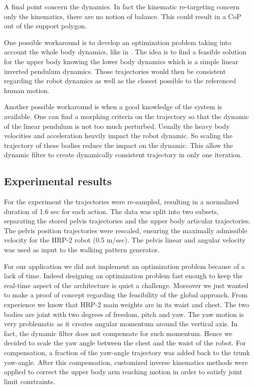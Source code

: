 A final point concern the dynamics.
In fact the kinematic re-targeting concern only the kinematics, there are no notion of balance.
This could result in a CoP out of the support polygon.

One possible workaround is to develop an optimization problem taking into account the whole body dynamics, like in \cite{ramos:ram:2015}.
The idea is to find a feasible solution for the upper body knowing the lower body dynamics which is a simple linear inverted pendulum dynamics.
Those trajectories would then be consistent regarding the robot dynamics as well as the closest possible to the referenced human motion.

Another possible workaround is when a good knowledge of the system is available.
One can find a morphing criteria on the trajectory so that the dynamic of the linear pendulum is not too much perturbed.
Usually the heavy body velocities and acceleration heavily impact the robot dynamic.
So scaling the trajectory of these bodies reduce the impact on the dynamic.
This allow the dynamic filter to create dynamically consistent trajectory in only one iteration.


\subsection{Experimental results}

For the experiment the trajectories were re-sampled, resulting
in a normalized duration of 1.6 sec for each action.
The data was split into two subsets, separating
the stored pelvis trajectories and the upper body articular trajectories.
The pelvis position trajectories were rescaled, ensuring the maximally admissible
velocity for the HRP-2 robot (0.5 m/sec).
The pelvis linear and angular velocity was used as input to the walking pattern generator.

For our application we did not implement an optimization problem because of a lack of time.
Indeed designing an optimization problem fast enough to keep the real-time aspect of the architecture is quiet a challenge.
Moreover we just wanted to make a proof of concept regarding the feasibility of the global approach.
From experience we know that HRP-2 main weights are in its waist and chest.
The two bodies are joint with two degrees of freedom, pitch and yaw.
The yaw motion is very problematic as it creates angular momentum around the vertical axis.
In fact, the dynamic filter does not compensate for such momentum.
Hence we decided to scale the yaw angle between the chest and the waist of the robot.
For compensation, a fraction of the yaw-angle trajectory was added back to the trunk yaw-angle.
After this compensation, customized inverse kinematics methods were applied to correct
the upper body arm reaching motion in order to satisfy joint limit constraints.

